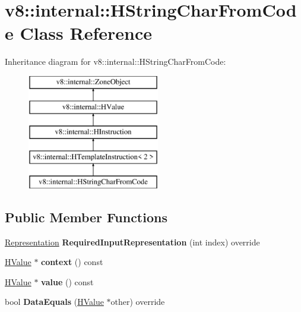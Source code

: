 \hypertarget{classv8_1_1internal_1_1_h_string_char_from_code}{}\section{v8\+:\+:internal\+:\+:H\+String\+Char\+From\+Code Class Reference}
\label{classv8_1_1internal_1_1_h_string_char_from_code}
Inheritance diagram for v8\+:\+:internal\+:\+:H\+String\+Char\+From\+Code\+:\begin{figure}[H]
\begin{center}
\leavevmode
\includegraphics[height=5.000000cm]{classv8_1_1internal_1_1_h_string_char_from_code}
\end{center}
\end{figure}
\subsection*{Public Member Functions}
\begin{DoxyCompactItemize}
\item 
\hyperlink{classv8_1_1internal_1_1_representation}{Representation} {\bfseries Required\+Input\+Representation} (int index) override\hypertarget{classv8_1_1internal_1_1_h_string_char_from_code_a126c85959fd0119b9a1cdca443fbc2af}{}\label{classv8_1_1internal_1_1_h_string_char_from_code_a126c85959fd0119b9a1cdca443fbc2af}

\item 
\hyperlink{classv8_1_1internal_1_1_h_value}{H\+Value} $\ast$ {\bfseries context} () const \hypertarget{classv8_1_1internal_1_1_h_string_char_from_code_aa31b1e75e17a78e0ceed18e72f924e04}{}\label{classv8_1_1internal_1_1_h_string_char_from_code_aa31b1e75e17a78e0ceed18e72f924e04}

\item 
\hyperlink{classv8_1_1internal_1_1_h_value}{H\+Value} $\ast$ {\bfseries value} () const \hypertarget{classv8_1_1internal_1_1_h_string_char_from_code_a940a90eb9bda2fc4267e18f9bb9f70aa}{}\label{classv8_1_1internal_1_1_h_string_char_from_code_a940a90eb9bda2fc4267e18f9bb9f70aa}

\item 
bool {\bfseries Data\+Equals} (\hyperlink{classv8_1_1internal_1_1_h_value}{H\+Value} $\ast$other) override\hypertarget{classv8_1_1internal_1_1_h_string_char_from_code_a6f4a62a3735293c2b7de41b3fa4ece1a}{}\label{classv8_1_1internal_1_1_h_string_char_from_code_a6f4a62a3735293c2b7de41b3fa4ece1a}

\end{DoxyCompactItemize}
